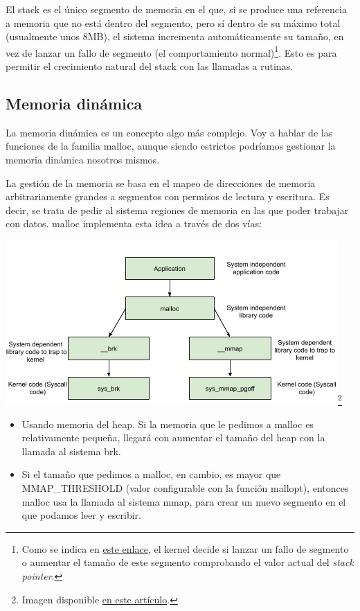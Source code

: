\documentclass[a4paper]{article}
\begin{document}
El stack es el único segmento de memoria en el que, si se produce una referencia a memoria que no está dentro del segmento, pero sí dentro de su máximo total (usualmente unos 8MB), el sistema incrementa automáticamente su tamaño, en vez de lanzar un fallo de segmento (el comportamiento normal)\footnote{Como se indica en \href{https://stackoverflow.com/questions/54564273/dynamic-expansion-of-the-linux-stack}{este enlace}, el kernel decide si lanzar un fallo de segmento o aumentar el tamaño de este segmento comprobando el valor actual del \emph{stack pointer}.}. Esto es para permitir el crecimiento natural del {\ttfamily stack} con las llamadas a rutinas.

\subsection{Memoria dinámica}

La memoria dinámica es un concepto algo más complejo. Voy a hablar de las funciones de la familia {\ttfamily malloc}, aunque siendo estrictos podríamos gestionar la memoria dinámica nosotros mismos.

La gestión de la memoria se basa en el mapeo de direcciones de memoria arbitrariamente grandes a segmentos con permisos de lectura y escritura. Es decir, se trata de pedir al sistema regiones de memoria en las que poder trabajar con datos. {\ttfamily malloc} implementa esta idea a través de dos vías:

\begin{center}
    \includegraphics[scale=0.6]{malloc.png}\footnote{Imagen disponible \href{https://sploitfun.wordpress.com/2015/02/11/syscalls-used-by-malloc/}{en este artículo}.}
\end{center}


\begin{itemize}
    \item Usando memoria del {\ttfamily heap}. Si la memoria que le pedimos a {\ttfamily malloc} es relativamente pequeña, llegará con aumentar el tamaño del {\ttfamily heap} con la llamada al sistema {\ttfamily brk}.
    \item Si el tamaño que pedimos a {\ttfamily malloc}, en cambio, es mayor que {\ttfamily MMAP\_THRESHOLD} (valor configurable con la función {\ttfamily mallopt}), entonces {\ttfamily malloc} usa la llamada al sistema {\ttfamily mmap}, para crear un nuevo segmento en el que podamos leer y escribir.
\end{itemize}
\end{document}
